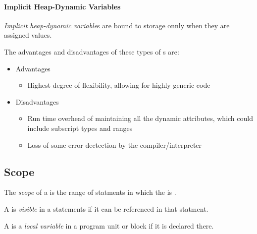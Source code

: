 \paragraph{Implicit Heap-Dynamic Variables}\label{par:Implicit_Heap-Dynamic_Variable_Binding_Lifetime}
\begin{definition}\label{def:Implicit_Heap-Dynamic_Variable_Binding_Lifetime}
  \emph{Implicit heap-dynamic variable}s are bound to  storage onnly when they are assigned values.
\end{definition}

The advantages and disadvantages of these types of s are:
\begin{itemize}[noitemsep]
\item Advantages
  \begin{itemize}[noitemsep]
  \item Highest degree of flexibility, allowing for highly generic code
  \end{itemize}
\item Disadvantages
  \begin{itemize}[noitemsep]
  \item Run time overhead of maintaining all the dynamic attributes, which could include subscript types and ranges
  \item Loss of some error dectection by the compiler/interpreter
  \end{itemize}
\end{itemize}

\subsection{Scope}\label{subsubsec:Variable_Scope}
\begin{definition}[Scope]\label{def:Variable_Scope}
  The \emph{scope} of a  is the range of statments in which the  is .
\end{definition}

\begin{definition}[Visible]\label{def:Visible_Variable}
  A  is \emph{visible} in a statements if it can be referenced in that statment.
\end{definition}

\begin{definition}\label{def:Local_Variable}
  A  is a \emph{local variable} in a program unit or block if it is declared there.
\end{definition}

